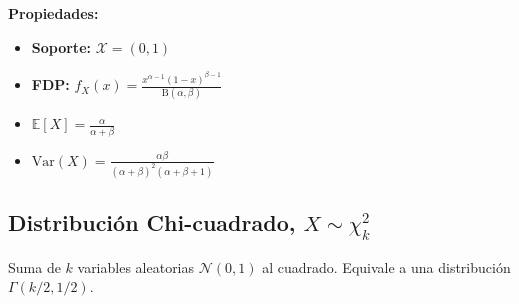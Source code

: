 \vspace{0.8em}
\noindent
\begin{minipage}[c]{0.45\textwidth}
    \textbf{Propiedades:}
    \begin{itemize}\setlength\itemsep{0.3em}
        \item \textbf{Soporte:} $\mathcal{X} = (0, 1)$
        \item \textbf{FDP:} $f_X(x) = \frac{x^{\alpha-1} (1-x)^{\beta-1}}{\text{B}(\alpha, \beta)}$
        \item $\mathbb{E}[X] = \frac{\alpha}{\alpha+\beta}$
        \item $\text{Var}(X) = \frac{\alpha\beta}{(\alpha+\beta)^2(\alpha+\beta+1)}$
    \end{itemize}
\end{minipage}%
\hfill
\begin{minipage}[c]{0.5\textwidth}
    \begin{center}
    \end{center}
\end{minipage}

\vspace{1.5em}

\subsection*{Distribución Chi-cuadrado, $X \sim \chi^2_k$}
Suma de $k$ variables aleatorias $\mathcal{N}(0,1)$ al cuadrado. Equivale a una distribución $\Gamma(k/2, 1/2)$.

